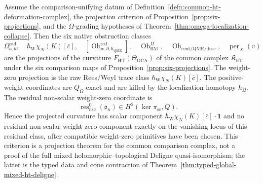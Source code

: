 \begin{thm}\label{thm:six-coordinates-one-curvature}
Assume the comparison-unifying datum of
Definition~\ref{defn:common-ht-deformation-complex}, the projection
criterion of Proposition~\ref{prop:six-projections}, and the
\(\Omega\)-grading hypotheses of
Theorem~\ref{thm:omega-localization-collapse}.  Then the six native
obstruction classes
\[
  \Omega^{\mathrm{rad}}_{a,b},\quad
  \hbar_{\mathrm{W}}\chi_N(K)[\bar c],\quad
  [\operatorname{Ob}^{\mathrm{red}}_{w,\partial,\hbar_{\mathrm{QME}}}],\quad
  \operatorname{Ob}^{\Pi}_{\mathrm{BM}},\quad
  \operatorname{Ob}_{\mathrm{cent/QME/desc}},\quad
  \operatorname{per}_X(v)
\]
are the projections of the curvature
\(F_{\mathrm{HT}}(\Theta_{\mathrm{OCA}})\) of the common complex
\(\mathfrak K_{\mathrm{HT}}\) under the six comparison maps of
Proposition~\ref{prop:six-projections}.  The weight-zero projection is
the raw Rees/Weyl trace class
\(\hbar_{\mathrm{W}}\chi_N(K)[\bar c]\).  The positive-weight coordinates
are \(Q_\Omega\)-exact and are killed by the localization homotopy
\(h_\Omega\).  The residual non-scalar weight-zero coordinate is
\[
  \operatorname{res}^{0}_{\mathrm{nsc}}(\mathfrak o_n)
  \in H^2(\ker\pi_{\mathrm{sc}},Q).
\]
Hence the projected curvature has scalar component
\(\hbar_{\mathrm{W}}\chi_N(K)[\bar c]\cdot\mathbf 1\) and no residual non-scalar
weight-zero component exactly on the vanishing locus of this residual
class, after compatible weight-zero primitives have been chosen.  This
criterion is a projection theorem for the common comparison complex, not
a proof of the full mixed holomorphic--topological Deligne
quasi-isomorphism; the latter is the typed data and cone
contraction of Theorem~\ref{thm:typed-global-mixed-ht-deligne}.
\end{thm}

